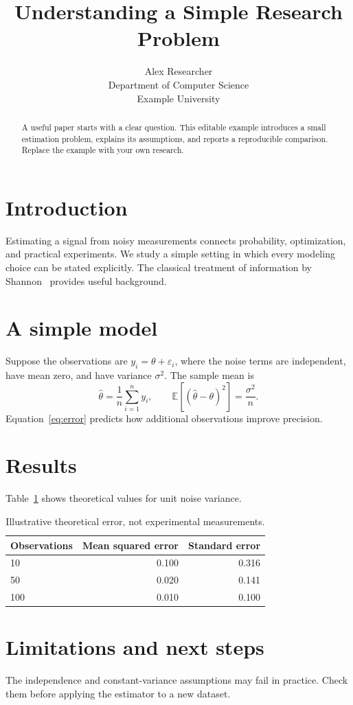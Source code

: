 \documentclass[10pt]{article}
\title{Understanding a Simple Research Problem}
\author{Alex Researcher \\ Department of Computer Science \\ Example University}
\date{}
\begin{document}
\maketitle
\begin{abstract}
A useful paper starts with a clear question. This editable example introduces a
small estimation problem, explains its assumptions, and reports a reproducible
comparison. Replace the example with your own research.
\end{abstract}
\section{Introduction}
Estimating a signal from noisy measurements connects probability, optimization,
and practical experiments. We study a simple setting in which every modeling
choice can be stated explicitly. The classical treatment of information by
Shannon~\cite{shannon1948} provides useful background.
\section{A simple model}
Suppose the observations are $y_i=\theta+\varepsilon_i$, where the noise terms
are independent, have mean zero, and have variance $\sigma^2$. The sample mean is
\begin{equation}
  \widehat\theta=\frac{1}{n}\sum_{i=1}^n y_i,
  \qquad \mathbb{E}\!\left[(\widehat\theta-\theta)^2\right]=\frac{\sigma^2}{n}.
  \label{eq:error}
\end{equation}
Equation~\eqref{eq:error} predicts how additional observations improve precision.
\section{Results}
Table~\ref{tab:results} shows theoretical values for unit noise variance.
\begin{table}[h]
\centering
\caption{Illustrative theoretical error, not experimental measurements.}
\label{tab:results}
\begin{tabular}{lrr}\toprule
Observations & Mean squared error & Standard error \\\midrule
10 & 0.100 & 0.316 \\
50 & 0.020 & 0.141 \\
100 & 0.010 & 0.100 \\\bottomrule
\end{tabular}
\end{table}
\section{Limitations and next steps}
The independence and constant-variance assumptions may fail in practice.
Check them before applying the estimator to a new dataset.


\end{document}
